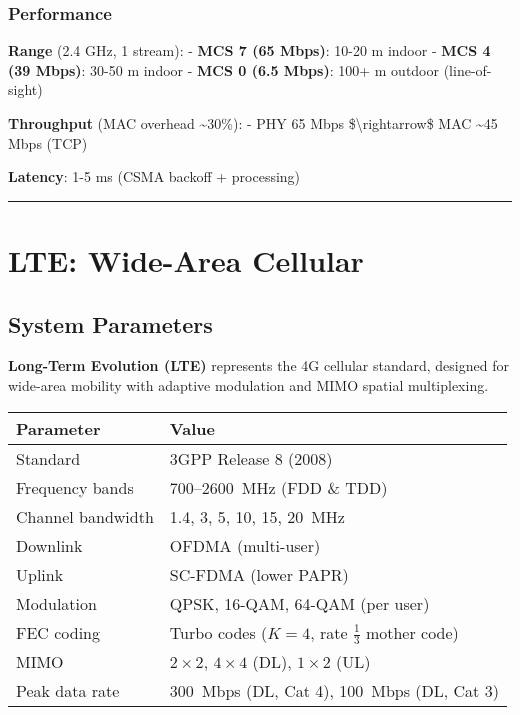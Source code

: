 \subsubsection{Performance}\label{performance}

\textbf{Range} (2.4 GHz, 1 stream): - \textbf{MCS 7 (65 Mbps)}: 10-20 m
indoor - \textbf{MCS 4 (39 Mbps)}: 30-50 m indoor - \textbf{MCS 0 (6.5
Mbps)}: 100+ m outdoor (line-of-sight)

\textbf{Throughput} (MAC overhead \textasciitilde30\%): - PHY 65 Mbps
\$\textbackslash rightarrow\$ MAC \textasciitilde45 Mbps (TCP)

\textbf{Latency}: 1-5 ms (CSMA backoff + processing)

\begin{center}\rule{0.5\linewidth}{0.5pt}\end{center}

\section{LTE: Wide-Area Cellular}
\label{sec:lte}

\subsection{System Parameters}

\textbf{Long-Term Evolution (LTE)} represents the 4G cellular standard, designed for wide-area mobility with adaptive modulation and MIMO spatial multiplexing.

\begin{tabular}{@{}ll@{}}
\toprule
\textbf{Parameter} & \textbf{Value} \\
\midrule
Standard & 3GPP Release 8 (2008) \\
Frequency bands & 700--2600~MHz (FDD \& TDD) \\
Channel bandwidth & 1.4, 3, 5, 10, 15, 20~MHz \\
Downlink & OFDMA (multi-user) \\
Uplink & SC-FDMA (lower PAPR) \\
Modulation & QPSK, 16-QAM, 64-QAM (per user) \\
FEC coding & Turbo codes ($K = 4$, rate $\frac{1}{3}$ mother code) \\
MIMO & $2 \times 2$, $4 \times 4$ (DL), $1 \times 2$ (UL) \\
Peak data rate & 300~Mbps (DL, Cat 4), 100~Mbps (DL, Cat 3) \\
\bottomrule
\end{tabular}

